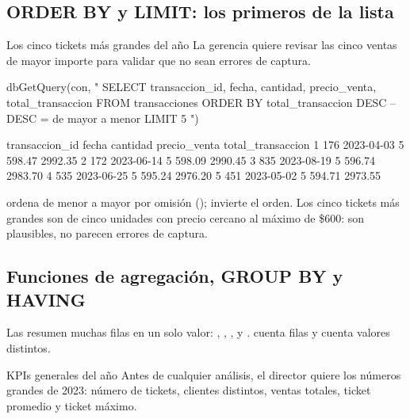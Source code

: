 \subsection{ORDER BY y LIMIT: los primeros de la lista}

\begin{ejemplo}{Los cinco tickets más grandes del año}
La gerencia quiere revisar las cinco ventas de mayor importe para validar
que no sean errores de captura.
\end{ejemplo}

\begin{rcode}
dbGetQuery(con, "
  SELECT transaccion_id, fecha, cantidad, precio_venta,
         total_transaccion
  FROM transacciones
  ORDER BY total_transaccion DESC   -- DESC = de mayor a menor
  LIMIT 5
")
\end{rcode}

\begin{rsalida}
  transaccion_id      fecha cantidad precio_venta total_transaccion
1            176 2023-04-03        5       598.47           2992.35
2            172 2023-06-14        5       598.09           2990.45
3            835 2023-08-19        5       596.74           2983.70
4            535 2023-06-25        5       595.24           2976.20
5            451 2023-05-02        5       594.71           2973.55
\end{rsalida}

 ordena de menor a mayor por omisión ();
 invierte el orden. Los cinco tickets más grandes son de cinco
unidades con precio cercano al máximo de \$600: son plausibles, no parecen
errores de captura.

\subsection{Funciones de agregación, GROUP BY y HAVING}

Las  resumen muchas filas en un solo
valor: , , ,  y
.  cuenta filas y
 cuenta valores distintos.

\begin{ejemplo}{KPIs generales del año}
Antes de cualquier análisis, el director quiere los números grandes de
2023: número de tickets, clientes distintos, ventas totales, ticket
promedio y ticket máximo.
\end{ejemplo}

